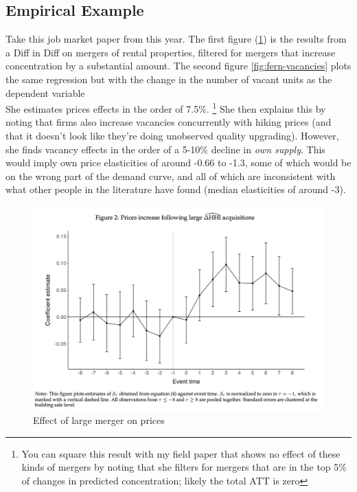 
\subsection{Empirical Example}

Take this job market paper from this year. The first figure (\ref{fig:fern-prices}) is the results from a Diff in Diff on mergers of rental properties, filtered for mergers that increase concentration by a substantial amount. The second figure \ref{fig:fern-vacancies} plots the same regression but with the change in the number of vacant units as the dependent variable\\

She estimates prices effects in the order of 7.5\%. \footnote{You can square this result with my field paper that shows no effect of these kinds of mergers by noting that she filters for mergers that are in the top 5\% of changes in predicted concentration; likely the total ATT is zero} She then explains this by noting that firms also increase vacancies concurrently with hiking prices (and that it doesn't look like they're doing unobserved quality upgrading). However, she finds vacancy effects in the order of a 5-10\% decline in \textit{own supply}. This would imply own price elasticities of around -0.66 to -1.3, some of which would be on the wrong part of the demand curve, and all of which are inconsistent with what other people in the literature have found (median elasticities of around -3).

\begin{figure}[htbp]
        \centering
        \includegraphics[width=0.5\linewidth]{figs/fern-jmp-prices.png}
        \caption{Effect of large merger on prices}
        \label{fig:fern-prices}
    \end{figure}

